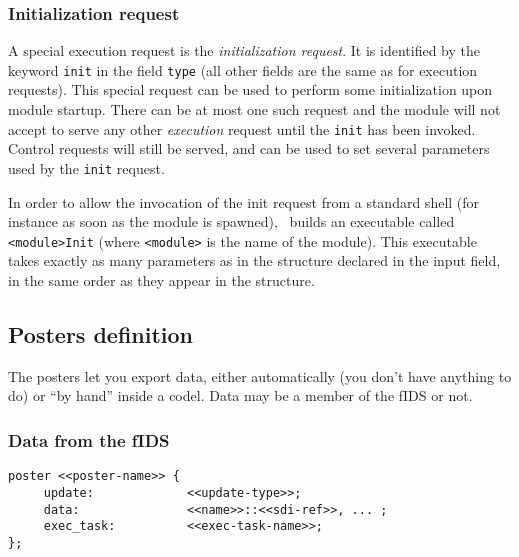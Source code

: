 \subsubsection{Initialization request}

A special execution request is the \emph{initialization request}. It is
identified by the keyword \texttt{init} in the field \texttt{type} (all other
fields are the same as for execution requests).  This special request can
be used to perform some initialization upon module startup. There can be
at most one such request and the module will not accept to serve any
other \emph{execution} request until the \texttt{init} has been invoked.
Control requests will still be served, and can be used to set several
parameters used by the \texttt{init} request.

In  order to allow the  invocation  of the init  request  from a standard
shell (for instance as soon as the  module is spawned), \GenoM\ builds an
executable called \texttt{<module>Init} (where \texttt{<module>} is the name of
the module). This executable takes exactly as
many parameters as in the structure  declared in the  input field, in the
same order as they appear in the structure.

\subsection{Posters definition}

The  posters let you export   data, either automatically  (you don't have
anything to do) or ``by hand'' inside  a codel.  Data may  be a member of
the fIDS or not.

\subsubsection{Data from the fIDS}

\begin{center}\begin{cartouche}\small\begin{verbatim}
poster <<poster-name>> {
     update:             <<update-type>>;
     data:               <<name>>::<<sdi-ref>>, ... ;
     exec_task:          <<exec-task-name>>;
};
\end{verbatim}\end{cartouche}\end{center}

